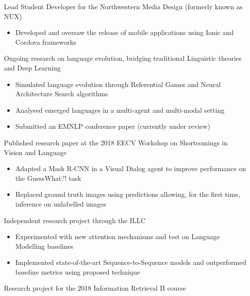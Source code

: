 
 Lead Student Developer for the Northwestern Media Design (formerly known as NUX)

\begin{itemize}
\item Developed and oversaw the release of mobile applications using Ionic and Cordova frameworks
\end{itemize}

Ongoing research on language evolution, bridging traditional Linguistic theories and Deep Learning
\begin{itemize}
    \item Simulated language evolution through Referential Games and Neural Architecture Search algorithms
    \item Analysed emerged languages in a multi-agent and multi-modal setting
    \item Submitted an EMNLP conference paper (currently under review)
\end{itemize}{}

Published research paper at the 2018 EECV Workshop on Shortcomings in Vision and Language
\begin{itemize}
    \item Adapted a Mask R-CNN in a Visual Dialog agent to improve performance on the GuessWhat?! task    
    \item Replaced ground truth images using predictions allowing, for the first time, inference on unlabelled images
\end{itemize}


Independent research project through the ILLC

\begin{itemize}
    \item Experimented with new attention mechanisms and test on Language Modelling baselines
    \item Implemented state-of-the-art Sequence-to-Sequence models and outperformed baseline metrics using proposed technique
\end{itemize}{}


Research project for the 2018 Information Retrieval II course

